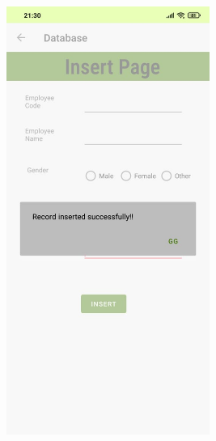 \documentclass[12pt,letterpaper]{article}
\begin{document}
\begin{figure}
    \centering
    \includegraphics[height=14cm, keepaspectratio]{Outputs/OP5.png}
\end{figure}

\newpage
\end{document}
